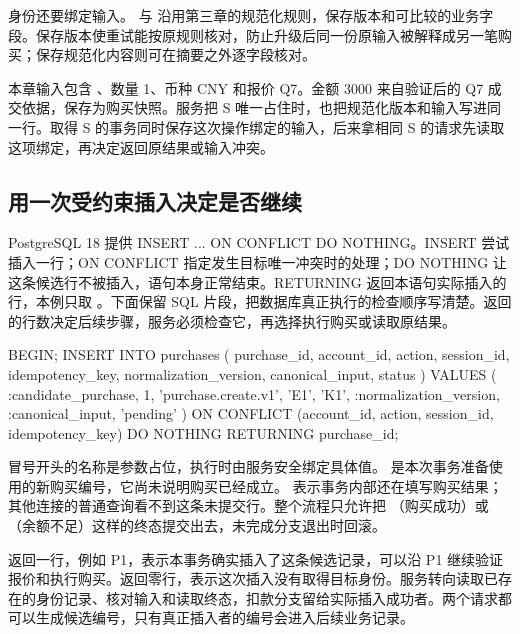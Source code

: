 身份还要绑定输入。 与  沿用第三章的规范化规则，保存版本和可比较的业务字段。保存版本使重试能按原规则核对，防止升级后同一份原输入被解释成另一笔购买；保存规范化内容则可在摘要之外逐字段核对。

本章输入包含 、数量 1、币种 CNY 和报价 Q7。金额 3000 来自验证后的 Q7 成交依据，保存为购买快照。服务把 S 唯一占住时，也把规范化版本和输入写进同一行。取得 S 的事务同时保存这次操作绑定的输入，后来拿相同 S 的请求先读取这项绑定，再决定返回原结果或输入冲突。



\subsection*{用一次受约束插入决定是否继续}

PostgreSQL 18 提供 INSERT ... ON CONFLICT DO NOTHING。INSERT 尝试插入一行；ON CONFLICT 指定发生目标唯一冲突时的处理；DO NOTHING 让这条候选行不被插入，语句本身正常结束。RETURNING 返回本语句实际插入的行，本例只取 \cite{pg}。下面保留 SQL 片段，把数据库真正执行的检查顺序写清楚。返回的行数决定后续步骤，服务必须检查它，再选择执行购买或读取原结果。

\begin{BookCode}
BEGIN;
INSERT INTO purchases (
  purchase_id, account_id, action, session_id,
  idempotency_key, normalization_version,
  canonical_input, status
) VALUES (
  :candidate_purchase, 1, 'purchase.create.v1', 'E1',
  'K1', :normalization_version, :canonical_input, 'pending'
)
ON CONFLICT (account_id, action, session_id, idempotency_key)
DO NOTHING
RETURNING purchase_id;
\end{BookCode}

冒号开头的名称是参数占位，执行时由服务安全绑定具体值。 是本次事务准备使用的新购买编号，它尚未说明购买已经成立。 表示事务内部还在填写购买结果；其他连接的普通查询看不到这条未提交行。整个流程只允许把 （购买成功）或 （余额不足）这样的终态提交出去，未完成分支退出时回滚。

返回一行，例如 P1，表示本事务确实插入了这条候选记录，可以沿 P1 继续验证报价和执行购买。返回零行，表示这次插入没有取得目标身份。服务转向读取已存在的身份记录、核对输入和读取终态，扣款分支留给实际插入成功者。两个请求都可以生成候选编号，只有真正插入者的编号会进入后续业务记录。



